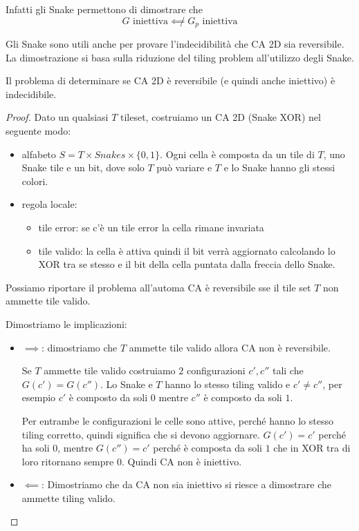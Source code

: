 Infatti gli Snake permettono di dimostrare che 
$$G \text{ iniettiva} \not\impliedby G_p \text{ iniettiva}$$

Gli Snake sono utili anche per provare l'indecidibilità che CA 2D sia reversibile.
La dimostrazione si basa sulla riduzione del tiling problem all'utilizzo degli 
Snake.

\begin{teorema}
    Il problema di determinare se CA 2D è reversibile (e quindi anche iniettivo)
    è indecidibile.
    \begin{proof}
        Dato un qualsiasi $T$ tileset, costruiamo un CA 2D (Snake XOR) nel seguente modo:
        \begin{itemize}
            \item alfabeto $S = T\times Snakes\times \{0,1\}$. Ogni cella è composta 
            da un tile di $T$, uno Snake tile e un bit, dove solo $T$ può variare e 
            $T$ e lo Snake hanno gli stessi colori.
            \item regola locale:
            \begin{itemize}
                \item tile error: se c'è un tile error la cella rimane invariata
                \item tile valido: la cella è attiva quindi il bit verrà aggiornato 
                calcolando lo XOR tra se stesso e il bit della cella puntata dalla 
                freccia dello Snake.
            \end{itemize}
        \end{itemize}

        Possiamo riportare il problema all'automa CA è reversibile sse il tile 
        set $T$ non ammette tile valido. 

        Dimostriamo le implicazioni:
        \begin{itemize}
            \item $\implies$: dimostriamo che $T$ ammette tile valido allora 
            CA non è reversibile.

            Se $T$ ammette tile valido costruiamo $2$ configurazioni $c', c''$
            tali che $G(c') = G(c'')$. Lo Snake e $T$ hanno lo stesso tiling valido
            e $c'\ne c''$, per esempio $c'$ è composto da soli $0$ mentre $c''$ 
            è composto da soli $1$.

            Per entrambe le configurazioni le celle sono attive, perché 
            hanno lo stesso tiling corretto, quindi significa che si devono aggiornare.
            $G(c') = c'$ perché ha soli $0$, mentre $G(c'') = c'$ perché è composta 
            da soli $1$ che in XOR tra di loro ritornano sempre $0$. Quindi CA non 
            è iniettivo.
            \item $\impliedby$: Dimostriamo che da CA non sia iniettivo si riesce 
            a dimostrare che ammette tiling valido.
                        

\end{itemize}
\end{proof}
\end{teorema}
